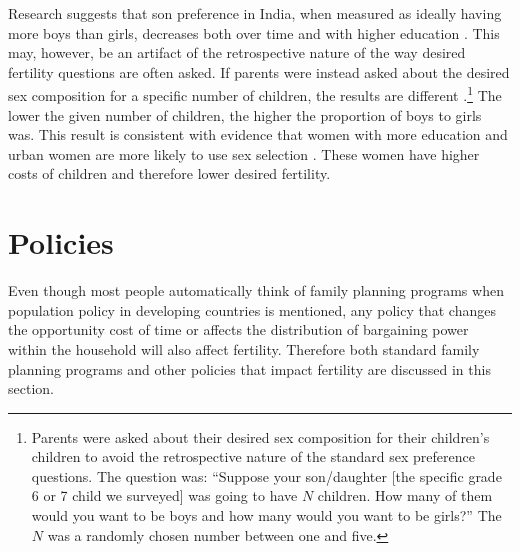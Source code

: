 Research suggests that son preference in India, when measured as ideally having more boys than girls, decreases both over time and with higher education \citep{bhat03,pande07}. This may, however, be an artifact of the retrospective nature of the way desired fertility questions are often asked. If parents were instead asked about the desired sex composition for a specific number of children, the results are different \citep{Jayachandran2017}.\footnote{Parents were asked about their desired sex composition for their children's children to avoid the retrospective nature of the standard sex preference questions. The question was: ``Suppose your son/daughter {[}the specific grade 6 or 7 child we surveyed{]} was going to have \(N\) children. How many of them would you want to be boys and how many would you want to be girls?'' The \(N\) was a randomly chosen number between one and five.} The lower the given number of children, the higher the proportion of boys to girls was. This result is consistent with evidence that women with more education and urban women are more likely to use sex selection \citep{Portner2015b}. These women have higher costs of children and therefore lower desired fertility.

\section{Policies}\label{policies}

Even though most people automatically think of family planning programs when population policy in developing countries is mentioned, any policy that changes the opportunity cost of time or affects the distribution of bargaining power within the household will also affect fertility. Therefore both standard family planning programs and other policies that impact fertility are discussed in this section.

